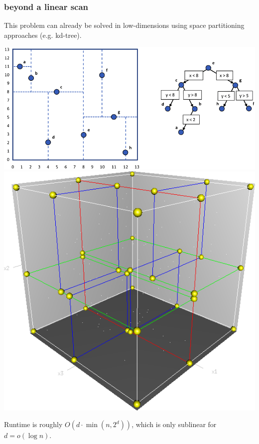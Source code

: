 \documentclass[compress]{beamer}
\begin{document}
\begin{frame}
	\frametitle{beyond a linear scan}	
	This problem can already be solved in low-dimensions using space partitioning approaches (e.g. kd-tree).
	
	\includegraphics[height=.4\textheight]{kdtree.png}	\includegraphics[height=.4\textheight]{3dtree.png}
	
	Runtime is roughly $O(d\cdot \min(n,2^d))$, which is only sublinear for $d = o(\log n)$.

\end{frame}
\end{document}
